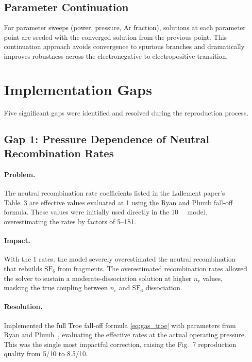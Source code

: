 \documentclass[11pt,a4paper]{report}
\newcommand{\SFsix}{\mathrm{SF}_6}
\begin{document}
\subsection{Parameter Continuation}
\label{sec:gasphase_continuation}

For parameter sweeps (power, pressure, Ar fraction), solutions at each parameter point are seeded with the converged solution from the previous point.  This continuation approach avoids convergence to spurious branches and dramatically improves robustness across the electronegative-to-electropositive transition.

\section{Implementation Gaps}
\label{sec:gasphase_gaps}

Five significant gaps were identified and resolved during the reproduction process.

\subsection{Gap 1: Pressure Dependence of Neutral Recombination Rates}
\label{sec:gap1}

\paragraph{Problem.} The neutral recombination rate coefficients listed in the Lallement paper's Table~3 are effective values evaluated at \SI{1}{\torr} using the Ryan and Plumb fall-off formula.  These values were initially used directly in the \SI{10}{\milli\torr} model, overestimating the rates by factors of 5--181.

\paragraph{Impact.} With the \SI{1}{\torr} rates, the model severely overestimated the neutral recombination that rebuilds $\SFsix$ from fragments.  The overestimated recombination rates allowed the solver to sustain a moderate-dissociation solution at higher $n_e$ values, masking the true coupling between $n_e$ and $\SFsix$ dissociation.

\paragraph{Resolution.} Implemented the full Troe fall-off formula \eqref{eq:gas_troe} with parameters from Ryan and Plumb~\cite{Ryan1990}, evaluating the effective rates at the actual operating pressure.  This was the single most impactful correction, raising the Fig.~7 reproduction quality from 5/10 to 8.5/10.
\end{document}
